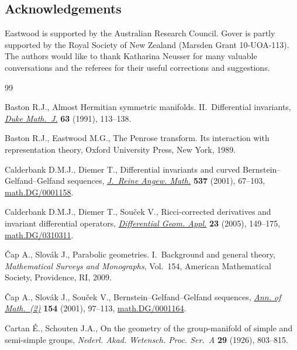 \documentclass[pdftex]{sigma}
\begin{document}
\subsection*{Acknowledgements}
Eastwood is supported by the Australian Research Council.
 Gover is partly supported by the Royal Society of New Zealand
(Marsden Grant 10-UOA-113).
 The authors would like to thank Katharina Neusser for many valuable
conversations and the referees for their useful corrections and suggestions.

\begin{thebibliography}{99}

\footnotesize\itemsep=0pt

Baston R.J.,
Almost Hermitian symmetric manifolds. II.~Dif\/ferential invariants,
\href{http://dx.doi.org/10.1215/S0012-7094-91-06306-4}{{\it Duke Math.~J.}} {\bf 63} (1991), 113--138.

Baston R.J., Eastwood M.G.,
The Penrose transform. Its interaction with representation theory,
Oxford University Press, New York, 1989.

Calderbank D.M.J., Diemer T.,
Dif\/ferential invariants and curved Bernstein--Gelfand--Gelfand sequences,
\href{http://dx.doi.org/10.1515/crll.2001.059}{{\it J.~Reine Angew. Math.}} {\bf 537} (2001), 67--103,
\href{http://arxiv.org/abs/math.DG/0001158}{math.DG/0001158}.

Calderbank D.M.J., Diemer T., Sou\v{c}ek V.,
Ricci-corrected derivatives and invariant dif\/ferential operators,
\href{http://dx.doi.org/10.1016/j.difgeo.2004.07.009}{{\it Differential Geom. Appl.}} {\bf 23} (2005), 149--175,
\href{http://arxiv.org/abs/math.DG/0310311}{math.DG/0310311}.

\v{C}ap A., Slov\'ak J.,
Parabolic geometries. I.~Background and general theory,
{\it Mathematical Surveys and Monographs}, Vol.~154, American Mathematical Society, Providence, RI, 2009.

\v{C}ap A., Slov\'ak J.,  Sou\v{c}ek V.,
Bernstein--Gelfand--Gelfand sequences,
\href{http://dx.doi.org/10.2307/3062111}{{\it Ann. of Math.~(2)}} {\bf 154} (2001), 97--113,
\href{http://arxiv.org/abs/math.DG/0001164}{math.DG/0001164}.

Cartan \'E., Schouten J.A.,
On the geometry of the group-manifold of simple and semi-simple groups,
{\it Nederl. Akad. Wetensch. Proc. Ser.~A} {\bf 29} (1926), 803--815.


\end{thebibliography}
\end{document}
